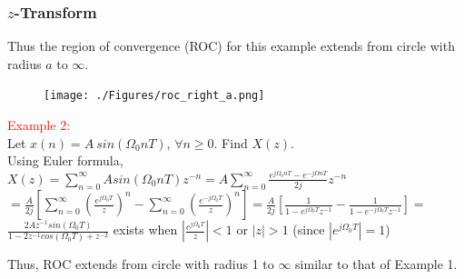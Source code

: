 \documentclass[mathserif, 10pt]{beamer} %
\begin{document}
{
\frametitle{$z$-Transform}

\small Thus the region of convergence (ROC) for this example extends from circle with radius $a$ to $\infty$.
\begin{figure}[h]
\hspace{1.5in}
\texttt{[image: ./Figures/roc\_right\_a.png]}
\end{figure}

\textcolor{red}{Example 2:} \\
Let  $ x(n) = A~sin(\Omega _0 nT)$, $\forall n \ge 0$. Find $X(z)$.  \\ \vspace{.1in}
Using Euler formula, \\
$X(z) = \sum_{n=0}^{\infty} Asin(\Omega_0 nT) z^{-n} =A \sum_{n=0}^{\infty} \frac{e^{j \Omega_0 nT}-e^{-j \Omega nT}}{2j}z^{-n}$ \\ \vspace{.1in}
$= \frac{A}{2j} \left [ \sum_{n=0}^{ \infty} (\frac{e^{j \Omega_0 T}}{z})^n - \sum_{n=0}^{ \infty} (\frac{e^{-j \Omega_0 T}}{z})^n \right ] = \frac {A}{2j} \left [ \frac{1}{1-e^{j \Omega_0 T}z^{-1}}-\frac{1}{1-e^{-j \Omega_0 T}z^{-1}} \right ]=$ \\ \vspace{.1in}
$ \frac{2Az^{-1}sin( \Omega_0 T)}{1-2z^{-1}cos( \Omega_0 T)+z^{-2}}$ exists when  $| \frac{e^{j \Omega_0 T}}{z} | <1 $ or $|z|>1 $  (since $|e^{j \Omega_0 T}|=1$)     \\ \vspace{.1in}

Thus, ROC extends from circle with radius  1 to $\infty$ similar to that of Example 1.
%

}
\end{document}
